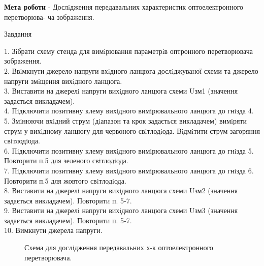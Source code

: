 \documentclass[a4paper,14pt]{extreport}
\begin{document}
\textbf{Мета роботи} - Дослiдження передавальних характеристик оптоелектронного перетворюва-
ча зображення.

\begin{center}
Завдання 
\end{center}

1. Зiбрати схему стенда для вимiрювання параметрiв оптронного перетворювача
зображення.\\
2. Ввiмкнути джерело напруги вхiдного ланцюга дослiджуваної схеми та джерело
напруги змiщення вихiдного ланцюга.\\
3. Виставити на джерелi напруги вихiдного ланцюга схеми
 Uзм1
 (значення задається викладачем).\\
4. Пiдключити позитивну клему вихiдного вимiрювального ланцюга до гнiзда 4.\\ 
5. Змiнюючи вхiдний струм (дiапазон та крок задається викладачем) вимiряти
струм у вихiдному ланцюгу для червоного свiтлодiода. Вiдмiтити струм загоряння
свiтлодiода.\\ 
6. Пiдключити позитивну клему вихiдного вимiрювального ланцюга до гнiзда 5.
Повторити п.5 для зеленого свiтлодiода.\\ 
7. Пiдключити позитивну клему вихiдного вимiрювального ланцюга до гнiзда 6.
Повторити п.5 для жовтого свiтлодiода.\\ 
8. Виставити на джерелi напруги вихiдного ланцюга схеми
 Uзм2
 (значення задається викладачем). Повторити п. 5-7.\\ 
9. Виставити на джерелi напруги вихiдного ланцюга схеми
 Uзм3
 (значення задається викладачем). Повторити п. 5-7.\\ 
10. Вимкнути джерела напруги.\\ 
\begin{figure}[h]
	\caption{ Схема для дослiдження передавальних х-к оптоелектронного перетворювача.}
	\label{ris1}
\end{figure}
\end{document}
